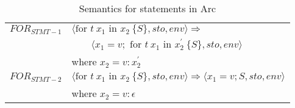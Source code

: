 \begin{table}[htb!]
    \centering
    \begin{tabular}{ll}
        \toprule
        $FOR_{STMT-1}$ & $\langle \text{for } t \ x_1 \text{ in } x_2 \ \{ S \}, sto, env \rangle \Rightarrow$                                      \\
                       & $\qquad \langle x_1 = v; \text{ for } t \ x_1 \text{ in } x^\prime_2 \ \{ S \}, sto, env \rangle$                          \\
                       & where $x_2 = v : x^\prime_2$                                                                                               \\[12pt]
        $FOR_{STMT-2}$ & $\langle \text{for } t \ x_1 \text{ in } x_2 \ \{ S \}, sto, env \rangle \Rightarrow \langle x_1 = v; S, sto, env \rangle$ \\
                       & where $x_2 = v : \epsilon$                                                                                                 \\
        \bottomrule
    \end{tabular}
    \caption{Semantics for statements in Arc}
    \label{tab:statementsemantics}
\end{table}

